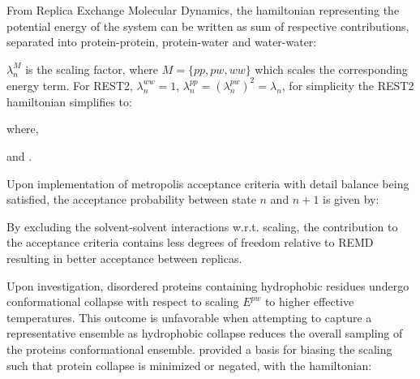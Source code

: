 From Replica Exchange Molecular Dynamics\cite{Sugita1999}, the hamiltonian representing the potential energy of the system can be written as sum of respective contributions, separated into protein-protein, protein-water and water-water:


$\lambda_{n}^M$ is the scaling factor, where $M=\{ pp, pw, ww\}
$ which scales the corresponding energy term. For REST2\cite{Wang2011}, $\lambda_n^{ww}=1$, $\lambda_n^{pp}=(\lambda_n^{pw})^2=\lambda_n$, for simplicity the REST2 hamiltonian simplifies to:

where,

and . 

Upon implementation of metropolis acceptance criteria with detail balance being satisfied, the acceptance probability between state $n$ and $n+1$ is given by:


By excluding the solvent-solvent interactions w.r.t. scaling, the contribution to the acceptance criteria contains less degrees of freedom relative to REMD resulting in better acceptance between replicas.

Upon investigation, disordered proteins containing hydrophobic residues undergo conformational collapse with respect to scaling  $E^{pw}$ to higher effective temperatures. 
This outcome is unfavorable when attempting to capture a representative ensemble as hydrophobic collapse reduces the overall sampling of the proteins conformational ensemble. %
\citeauthor{Zhang2023} \citeyear{Zhang2023} provided a basis for biasing the scaling such that protein collapse is minimized or negated, with the hamiltonian:


